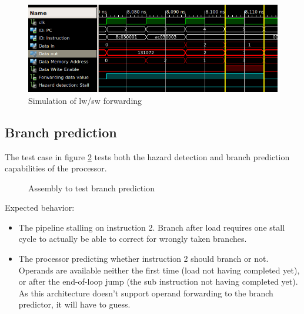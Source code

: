 \begin{figure}[ht!]
  \begin{center}
    \includegraphics[width=\textwidth]{assets/lw-sw-forwarding.png}
  \end{center}
  \caption{Simulation of lw/sw forwarding}
  \label{fig:simulate_lw_sw}
\end{figure}

\subsection{Branch prediction}

The test case in figure \ref{fig:test-branch-prediction} tests both the hazard detection and branch prediction capabilities of the processor.

\begin{figure}[h]
  \caption{Assembly to test branch prediction} \label{fig:test-branch-prediction}
\end{figure}

Expected behavior:
\begin{itemize}
  \item
    The pipeline stalling on instruction 2. Branch after load requires one stall cycle to actually be able to correct for wrongly taken branches.
  \item
    The processor predicting whether instruction 2 should branch or not.
    Operands are available neither the first time (load not having completed yet), or after the end-of-loop jump (the sub instruction not having completed yet).
    As this architecture doesn't support operand forwarding to the branch predictor, it will have to guess.
\end{itemize}

